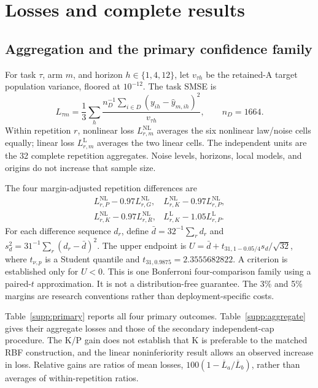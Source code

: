 
\section{Losses and complete results}\label{supp:results}
\subsection{Aggregation and the primary confidence family}
For task $\tau$, arm $m$, and horizon $h\in\{1,4,12\}$, let $v_{\tau h}$ be the retained-A target population variance, floored at $10^{-12}$. The task SMSE is
\[
 L_{\tau m}=\frac13\sum_h\frac{n_D^{-1}\sum_{i\in D}(y_{ih}-\widehat y_{m,ih})^2}{v_{\tau h}},\qquad n_D=1664.
\]
Within repetition $r$, nonlinear loss $L^{\mathrm{NL}}_{r,m}$ averages the six nonlinear law/noise cells equally; linear loss $L^{\mathrm L}_{r,m}$ averages the two linear cells. The independent units are the 32 complete repetition aggregates. Noise levels, horizons, local models, and origins do not increase that sample size.

The four margin-adjusted repetition differences are
\[
 \begin{array}{ll}
 L^{\mathrm{NL}}_{r,P}-0.97L^{\mathrm{NL}}_{r,G},&
 L^{\mathrm{NL}}_{r,K}-0.97L^{\mathrm{NL}}_{r,P},\\
 L^{\mathrm{NL}}_{r,K}-0.97L^{\mathrm{NL}}_{r,R},&
 L^{\mathrm L}_{r,K}-1.05L^{\mathrm L}_{r,P}.
 \end{array}
\]
For each difference sequence $d_r$, define $\bar d=32^{-1}\sum_r d_r$ and $s_d^2=31^{-1}\sum_r(d_r-\bar d)^2$. The upper endpoint is $U=\bar d+t_{31,1-0.05/4}s_d/\sqrt{32}$, where $t_{\nu,p}$ is a Student quantile and $t_{31,0.9875}=2.3555682822$. A criterion is established only for $U<0$. This is one Bonferroni four-comparison family using a paired-$t$ approximation. It is not a distribution-free guarantee. The 3\% and 5\% margins are research conventions rather than deployment-specific costs.

Table~\ref{supp:primary} reports all four primary outcomes. Table~\ref{supp:aggregate} gives their aggregate losses and those of the secondary independent-cap procedure. The K/P gain does not establish that K is preferable to the matched RBF construction, and the linear noninferiority result allows an observed increase in loss. Relative gains are ratios of mean losses, $100(1-\overline L_a/\overline L_b)$, rather than averages of within-repetition ratios.

\begin{table}[htbp]\centering\small
\caption{Complete primary family. The margin-adjusted mean and upper endpoint are in absolute SMSE units. ``Sup.'' denotes superiority and ``NI'' noninferiority. The inferential unit is a repetition aggregate.}\label{supp:primary}
\end{table}
\begin{table}[htbp]\centering\small
\caption{Mean terminal SMSE and repetition standard deviation (SD). Independent cap selection is secondary. SD is not a confidence interval.}\label{supp:aggregate}
\end{table}
\FloatBarrier

